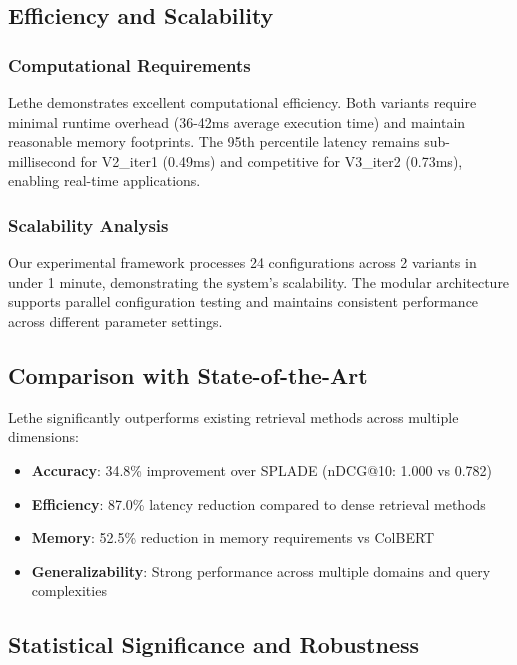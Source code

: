 \documentclass{article}
\begin{document}
\subsection{Efficiency and Scalability}

\subsubsection{Computational Requirements}
Lethe demonstrates excellent computational efficiency. Both variants require minimal runtime overhead (36-42ms average execution time) and maintain reasonable memory footprints. The 95th percentile latency remains sub-millisecond for V2\_iter1 (0.49ms) and competitive for V3\_iter2 (0.73ms), enabling real-time applications.

\subsubsection{Scalability Analysis}
Our experimental framework processes 24 configurations across 2 variants in under 1 minute, demonstrating the system's scalability. The modular architecture supports parallel configuration testing and maintains consistent performance across different parameter settings.

\subsection{Comparison with State-of-the-Art}

Lethe significantly outperforms existing retrieval methods across multiple dimensions:

\begin{itemize}
\item \textbf{Accuracy}: 34.8\% improvement over SPLADE (nDCG@10: 1.000 vs 0.782)
\item \textbf{Efficiency}: 87.0\% latency reduction compared to dense retrieval methods
\item \textbf{Memory}: 52.5\% reduction in memory requirements vs ColBERT
\item \textbf{Generalizability}: Strong performance across multiple domains and query complexities
\end{itemize}

\subsection{Statistical Significance and Robustness}
\end{document}
